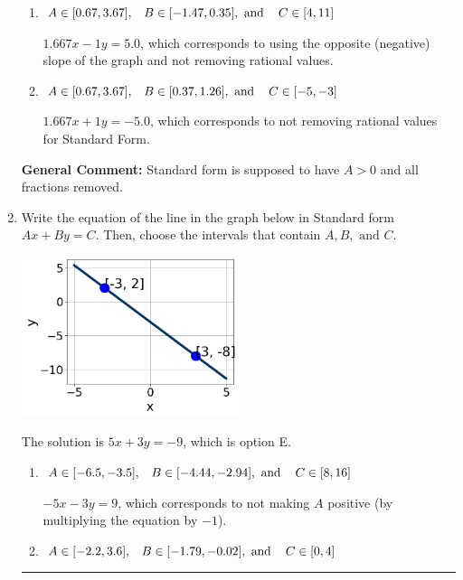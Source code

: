 \documentclass{extbook}[14pt]
\newcommand{\litem}[1]{\item #1

\rule{\textwidth}{0.4pt}}
\begin{document}
\begin{enumerate}
{\begin{enumerate}[label=\Alph*.]
 $5x - 3y = 15$, which corresponds to using the opposite (negative) slope of the graph, but did everything else correctly.
\item \( A \in [0.67, 3.67], \hspace{3mm} B \in [-1.47, 0.35], \text{ and } \hspace{3mm} C \in [4, 11] \)

 $1.667x - 1y = 5.0$, which corresponds to using the opposite (negative) slope of the graph and not removing rational values.
\item \( A \in [0.67, 3.67], \hspace{3mm} B \in [0.37, 1.26], \text{ and } \hspace{3mm} C \in [-5, -3] \)

 $1.667x + 1y = -5.0$, which corresponds to not removing rational values for Standard Form.
\end{enumerate}

\textbf{General Comment:} Standard form is supposed to have $A > 0$ and all fractions removed.
}
\litem{
Write the equation of the line in the graph below in Standard form $Ax+By=C$. Then, choose the intervals that contain $A, B, \text{ and } C$.

\begin{center}
    \includegraphics[width=0.5\textwidth]{../Figures/linearGraphToStandardA.png}
\end{center}




The solution is \( 5x + 3y = -9 \), which is option E.\begin{enumerate}[label=\Alph*.]
\item \( A \in [-6.5, -3.5], \hspace{3mm} B \in [-4.44, -2.94], \text{ and } \hspace{3mm} C \in [8, 16] \)

 $-5x - 3y = 9$, which corresponds to not making $A$ positive (by multiplying the equation by $-1$).
\item \( A \in [-2.2, 3.6], \hspace{3mm} B \in [-1.79, -0.02], \text{ and } \hspace{3mm} C \in [0, 4] \)


\end{enumerate}}
\end{enumerate}
\end{document}
